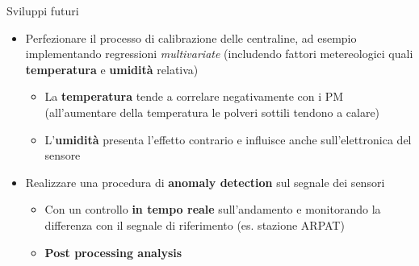 \begin{frame}{Sviluppi futuri}
\begin{itemize}
  \item Perfezionare il processo di calibrazione delle centraline, ad esempio implementando regressioni \textit{multivariate} (includendo fattori metereologici quali \textbf{temperatura} e \textbf{umidità} relativa)\vspace{0.1cm}
  \begin{itemize}
    \item La \textbf{temperatura} tende a correlare negativamente con i PM (all'aumentare della temperatura le polveri sottili tendono a calare)
    \item L'\textbf{umidità} presenta l'effetto contrario e influisce anche sull'elettronica del sensore
  \end{itemize}\vspace{0.1cm}
  \item Realizzare una procedura di \textbf{anomaly detection} sul segnale dei sensori\vspace{0.1cm}
  \begin{itemize}
    \item Con un controllo \textbf{in tempo reale} sull'andamento e monitorando la differenza con il segnale di riferimento (es. stazione ARPAT)
    \item \textbf{Post processing analysis}
  \end{itemize}
\end{itemize}
\end{frame}

